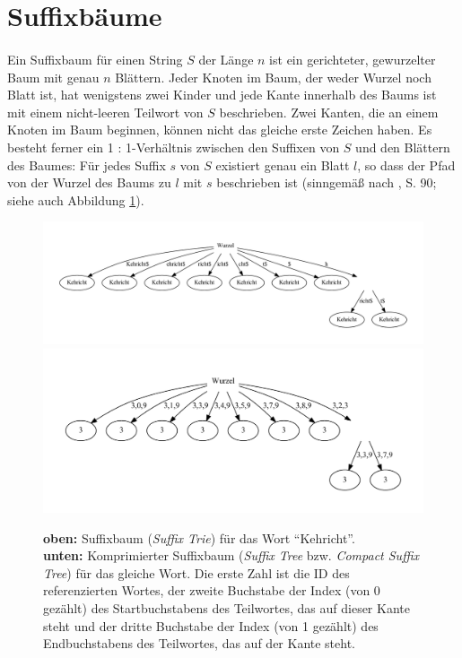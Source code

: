 \section{Suffixbäume}
\label{meth-suffix}

\paragraph{} Ein Suffixbaum für einen String $S$ der Länge $n$ ist ein gerichteter, gewurzelter Baum mit genau $n$ Blättern. Jeder Knoten im Baum, der weder Wurzel noch Blatt ist, hat wenigstens zwei Kinder und jede Kante innerhalb des Baums ist mit einem nicht-leeren Teilwort von $S$ beschrieben. Zwei Kanten, die an einem Knoten im Baum beginnen, können nicht das gleiche erste Zeichen haben. Es besteht ferner ein 1 : 1-Verhältnis zwischen den Suffixen von $S$ und den Blättern des Baumes: Für jedes Suffix $s$ von $S$ existiert genau ein Blatt $l$, so dass der Pfad von der Wurzel des Baums zu $l$ mit $s$ beschrieben ist (sinngemäß nach \cite{gusfield}, S. 90; siehe auch Abbildung \ref{fig-kehrichtSuffixTree}).

\begin{figure}
\includegraphics[scale=0.4]{resources/kehrichtSuffixTree.pdf}
\includegraphics[scale=0.5]{resources/kehrichtCompressedSuffixTree.pdf}
\caption{\textbf{oben:} Suffixbaum  (\textit{Suffix Trie}) für das Wort "`Kehricht"'.\\\textbf{unten:} Komprimierter Suffixbaum (\textit{Suffix Tree} bzw. \textit{Compact Suffix Tree}) für das gleiche Wort. Die erste Zahl ist die ID des referenzierten Wortes, der zweite Buchstabe der Index (von 0 gezählt) des Startbuchstabens des Teilwortes, das auf dieser Kante steht und der dritte Buchstabe der Index (von 1 gezählt) des Endbuchstabens des Teilwortes, das auf der Kante steht.}
\label{fig-kehrichtSuffixTree}
\end{figure}

